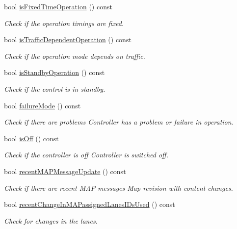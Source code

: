 \begin{DoxyCompactItemize}
bool \hyperlink{classV2XIntersection_a23b86c1a5263021520965973f35efaa4}{is\+Fixed\+Time\+Operation} () const 
\begin{DoxyCompactList}\small\item\em Check if the operation timings are fixed. \end{DoxyCompactList}\item 
bool \hyperlink{classV2XIntersection_a50c3c15528fc61daddc97753a2ea0ad5}{is\+Traffic\+Dependent\+Operation} () const 
\begin{DoxyCompactList}\small\item\em Check if the operation mode depends on traffic. \end{DoxyCompactList}\item 
bool \hyperlink{classV2XIntersection_aaf2db69bd139e08f291a3c7fea63c834}{is\+Standby\+Operation} () const 
\begin{DoxyCompactList}\small\item\em Check if the control is in standby. \end{DoxyCompactList}\item 
bool \hyperlink{classV2XIntersection_a8516c318474941b4bd17c54e5ade01f2}{failure\+Mode} () const 
\begin{DoxyCompactList}\small\item\em Check if there are problems Controller has a problem or failure in operation. \end{DoxyCompactList}\item 
bool \hyperlink{classV2XIntersection_a5afda06f57afa866ef3f5ea2f41b24f7}{is\+Off} () const 
\begin{DoxyCompactList}\small\item\em Check if the controller is off Controller is switched off. \end{DoxyCompactList}\item 
bool \hyperlink{classV2XIntersection_a0e892b0e723d830ab485ff2d2eba70b6}{recent\+M\+A\+P\+Message\+Update} () const 
\begin{DoxyCompactList}\small\item\em Check if there are recent M\+AP messages Map revision with content changes. \end{DoxyCompactList}\item 
bool \hyperlink{classV2XIntersection_a2db48bde4581f4e42e72218c6591db74}{recent\+Change\+In\+M\+A\+Passigned\+Lanes\+I\+Ds\+Used} () const 
\begin{DoxyCompactList}\small\item\em Check for changes in the lanes. \end{DoxyCompactList}\item 

\end{DoxyCompactItemize}
